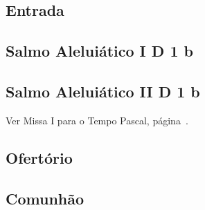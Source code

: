 
\subsection{Entrada}\label{subsection:tempus-paschale/missa-2/introitus}

\subsection[Salmo Aleluiático I]{Salmo Aleluiático I \textmd{D 1 b}}\label{subsection:tempus-paschale/missa-2/psalmus-alleluiaticus-1}

\AllowPageFlush

\subsection[Salmo Aleluiático II]{Salmo Aleluiático II \textmd{D 1 b}}\label{subsection:tempus-paschale/missa-2/psalmus-alleluiaticus-2}

\begin{rubrica}
  Ver Missa I para o Tempo Pascal, página~\pageref{subsection:tempus-paschale/missa-1/alleluia}.
\end{rubrica}

\AllowPageFlush

\subsection{Ofertório}\label{subsection:tempus-paschale/missa-2/offertorium}

\AllowPageFlush

\subsection{Comunhão}\label{subsection:tempus-paschale/missa-2/communio}
